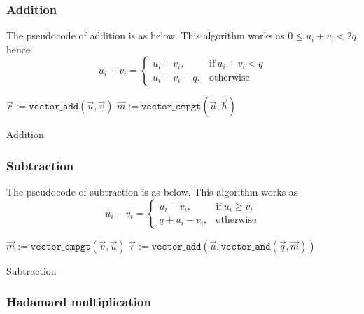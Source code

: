\documentclass[oneside,9pt]{article}
\begin{document}
\subsubsection{Addition}

The pseudocode of addition is as below. This algorithm works as $0 \leq u_i + v_i < 2q$, hence
\begin{equation}
u_i + v_i = 
\begin{cases}
	u_i + v_i, & \text{if}\ u_i + v_i < q \\
	u_i + v_i - q, & \text{otherwise}
\end{cases}
\end{equation}

\begin{algorithm}[]
 $\vec{r} := \texttt{vector\_add}(\vec{u}, \vec{v})$\;
 $\vec{m} := \texttt{vector\_cmpgt}(\vec{u}, \vec{h})$\;
 \caption{Addition}
\end{algorithm}

\subsubsection{Subtraction}
The pseudocode of subtraction is as below. This algorithm works as 
\begin{equation}
u_i - v_i = 
\begin{cases}
	u_i - v_i, & \text{if}\ u_i \geq v_i \\
	q + u_i - v_i, & \text{otherwise}
\end{cases}
\end{equation}

\begin{algorithm}[]
 $\vec{m} := \texttt{vector\_cmpgt}(\vec{v}, \vec{u})$\;
 $\vec{r} := \texttt{vector\_add}(\vec{u}, \texttt{vector\_and}(\vec{q}, \vec{m}))$\;
 \caption{Subtraction}
\end{algorithm}

\subsubsection{Hadamard multiplication}
\end{document}
